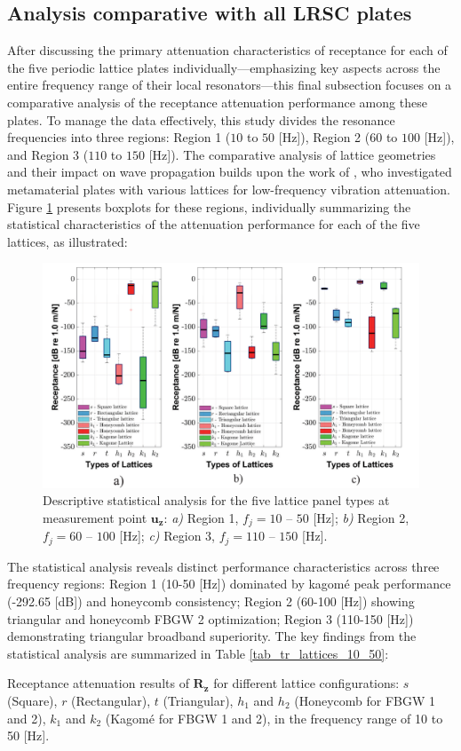 \documentclass[review,numbers,sort&compress]{elsarticle}
\begin{document}
{\subsection{Analysis comparative with all LRSC plates}\label{comp_panels_all_lats}
After discussing the primary attenuation characteristics of receptance for each of the five periodic lattice plates individually---emphasizing key aspects across the entire frequency range of their local resonators---this final subsection focuses on a comparative analysis of the receptance attenuation performance among these plates. To manage the data effectively, this study divides the resonance frequencies into three regions: Region 1 ($10$ to $50$ [Hz]), Region 2 ($60$ to $100$ [Hz]), and Region 3 ($110$ to $150$ [Hz]). The comparative analysis of lattice geometries and their impact on wave propagation builds upon the work of \cite{Yan2022}, who investigated metamaterial plates with various lattices for low-frequency vibration attenuation.
Figure \ref{all_comp_frf_stat_lat} presents boxplots for these regions, individually summarizing the statistical characteristics of the attenuation performance for each of the five lattices, as illustrated:
\newpage
\begin{figure}[htb]
	\centering	
	\includegraphics[width=1.0\textwidth]{all_comp_frf_stat_lat.pdf}	
	\caption{Descriptive statistical analysis for the five lattice panel types at measurement point $\mathbf{u_z}$: \textit{a)} Region 1, $f_j = 10$ -- $50$ [Hz]; \textit{b)} Region 2, $f_j = 60$ -- $100$ [Hz]; \textit{c)} Region 3, $f_j = 110$ -- $150$ [Hz].}
	\label{all_comp_frf_stat_lat}
\end{figure}

The statistical analysis reveals distinct performance characteristics across three frequency regions: Region 1 (10-50 [Hz]) dominated by kagomé peak performance (-292.65 [dB]) and honeycomb consistency; Region 2 (60-100 [Hz]) showing triangular and honeycomb FBGW 2 optimization; Region 3 (110-150 [Hz]) demonstrating triangular broadband superiority. The key findings from the statistical analysis are summarized in Table \ref{tab_tr_lattices_10_50}:
\newpage
\begin{table}[htb]
    \centering
\caption{Receptance attenuation results of $\mathbf{R_z}$ for different lattice configurations: \( s \) (Square), \( r \) (Rectangular), \( t \) (Triangular), \( h_1 \) and \( h_2 \) (Honeycomb for FBGW 1 and 2), \( k_1 \) and \( k_2 \) (Kagomé for FBGW 1 and 2), in the frequency range of 10 to 50 [Hz].}


\end{table}}
\end{document}
